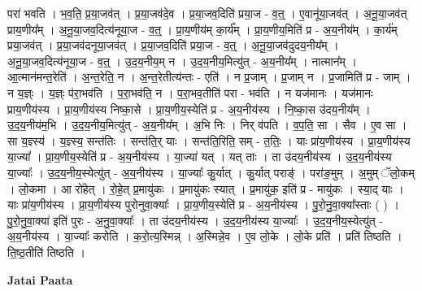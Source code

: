 \documentclass[17pt]{extarticle}
\begin{document}
परा॑ भवति । भ॒व॒ति॒ प्र॒या॒जव॑त् । प्र॒या॒जव॑दे॒व । प्र॒या॒जव॒दिति॑ प्रया॒ज - व॒त्॒ । ए॒वानू॑या॒जव॑त् । अ॒नू॒या॒जव॑त् प्राय॒णीय᳚म् । अ॒नू॒या॒जव॒दित्य॑नूया॒ज - व॒त्॒ । प्रा॒य॒णीय॑म् का॒र्य᳚म् । प्रा॒य॒णीय॒मिति॑ प्र - अ॒य॒नीय᳚म् । का॒र्य॑म् प्रया॒जव॑त् । प्र॒या॒जव॑दनूया॒जव॑त् । प्र॒या॒जव॒दिति॑ प्रया॒ज - व॒त्॒ । अ॒नू॒या॒जव॑दुदय॒नीय᳚म् । अ॒नू॒या॒जव॒दित्य॑नूया॒ज - व॒त्॒ । उ॒द॒य॒नीय॒म् न । उ॒द॒य॒नीय॒मित्यु॑त् - अ॒य॒नीय᳚म् । नात्मान᳚म् । आ॒त्मान॑मन्त॒रेति॑ । अ॒न्त॒रेति॒ न । अ॒न्त॒रेतीत्य॑न्तः - एति॑ । न प्र॒जाम् । प्र॒जाम् न । प्र॒जामिति॑ प्र - जाम् । न य॒ज्ञ्ः । य॒ज्ञ्ः प॑रा॒भव॑ति । प॒रा॒भव॑ति॒ न । प॒रा॒भव॒तीति॑ परा - भव॑ति । न यज॑मानः । यज॑मानः प्राय॒णीय॑स्य । प्रा॒य॒णीय॑स्य निष्का॒से । प्रा॒य॒णीय॒स्येति॑ प्र - अ॒य॒नीय॑स्य । नि॒ष्का॒स उ॑दय॒नीय᳚म् । उ॒द॒य॒नीय॑म॒भि । उ॒द॒य॒नीय॒मित्यु॑त् - अ॒य॒नीय᳚म् । अ॒भि निः । निर् व॑पति । व॒प॒ति॒ सा । सैव । ए॒व सा । सा य॒ज्ञ्स्य॑ । य॒ज्ञ्स्य॒ सन्त॑तिः । सन्त॑ति॒र् याः । सन्त॑ति॒रिति॒ सम् - त॒तिः॒ । याः प्रा॑य॒णीय॑स्य । प्रा॒य॒णीय॑स्य या॒ज्या᳚ । प्रा॒य॒णीय॒स्येति॑ प्र - अ॒य॒नीय॑स्य । या॒ज्या॑ यत् । यत् ताः । ता उ॑दय॒नीय॑स्य । उ॒द॒य॒नीय॑स्य या॒ज्याः᳚ । उ॒द॒य॒नीय॒स्येत्यु॑त् - अ॒य॒नीय॑स्य । या॒ज्याः᳚ कु॒र्यात् । कु॒र्यात् पराङ्‍॑ । परा॑ङ॒मुम् । अ॒मुम् ॅलो॒कम् । लो॒कमा । आ रो॑हेत् । रो॒हे॒त् प्र॒मायु॑कः । प्र॒मायु॑कः स्यात् । प्र॒मायु॑क॒ इति॑ प्र - मायु॑कः । स्या॒द् याः । याः प्रा॑य॒णीय॑स्य । प्रा॒य॒णीय॑स्य पुरोनुवा॒क्याः᳚ । प्रा॒य॒णीय॒स्येति॑ प्र - अ॒य॒नीय॑स्य । पु॒रो॒नु॒वा॒क्या᳚स्ताः ( ) । पु॒रो॒नु॒वा॒क्या॑ इति॑ पुरः - अ॒नु॒वा॒क्याः᳚ । ता उ॑दय॒नीय॑स्य । उ॒द॒य॒नीय॑स्य या॒ज्याः᳚ । उ॒द॒य॒नीय॒स्येत्यु॑त् - अ॒य॒नीय॑स्य । या॒ज्याः᳚ करोति । क॒रो॒त्य॒स्मिन्न् । अ॒स्मिन्ने॒व । ए॒व लो॒के । लो॒के प्रति॑ । प्रति॑ तिष्ठति । ति॒ष्ठ॒तीति॑ तिष्ठति । \newline

\textbf{Jatai Paata} \newline
\end{document}
